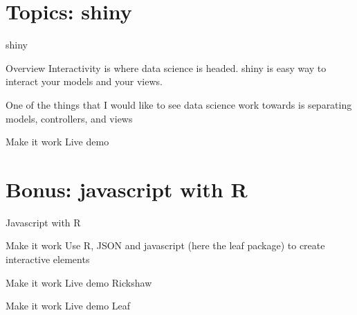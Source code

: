 \documentclass[xcolor=dvipsnames]{beamer}
\begin{document}
\section{Topics: shiny}
\begin{frame}[t,allowframebreaks]{shiny}
\begin{block}{Overview}
Interactivity is where data science is headed. shiny is easy way to interact your models and your views. 
\end{block}
One of the things that I would like to see data science work towards is separating models, controllers, and views
\begin{block}{Make it work}
Live demo 
\end{block}

\end{frame}

\section{Bonus: javascript with R}
\begin{frame}[t,allowframebreaks]{Javascript with R}

\begin{block}{Make it work}
Use R, JSON and javascript (here the leaf package) to create interactive elements
\end{block}

\begin{block}{Make it work}
Live demo Rickshaw
\end{block}

\begin{block}{Make it work}
Live demo Leaf
\end{block}

\end{frame}


 
\end{document}
